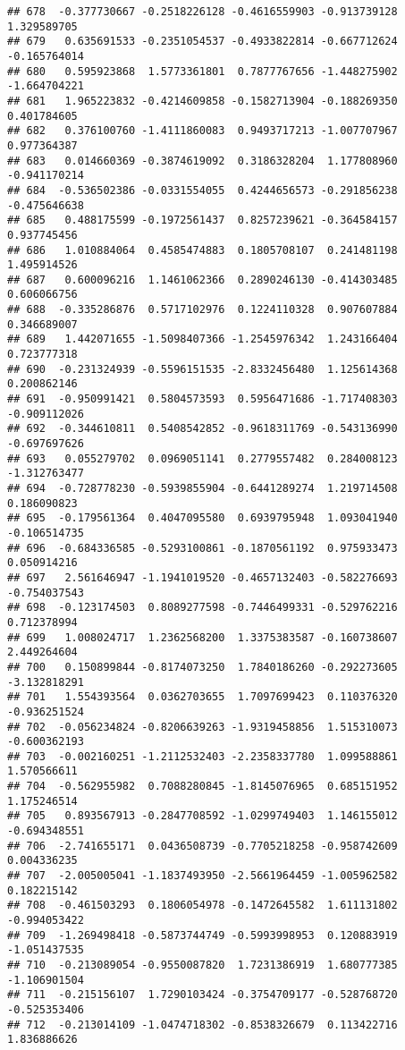 \documentclass[
]{article}
\begin{document}
\begin{verbatim}
## 678  -0.377730667 -0.2518226128 -0.4616559903 -0.913739128  1.329589705
## 679   0.635691533 -0.2351054537 -0.4933822814 -0.667712624 -0.165764014
## 680   0.595923868  1.5773361801  0.7877767656 -1.448275902 -1.664704221
## 681   1.965223832 -0.4214609858 -0.1582713904 -0.188269350  0.401784605
## 682   0.376100760 -1.4111860083  0.9493717213 -1.007707967  0.977364387
## 683   0.014660369 -0.3874619092  0.3186328204  1.177808960 -0.941170214
## 684  -0.536502386 -0.0331554055  0.4244656573 -0.291856238 -0.475646638
## 685   0.488175599 -0.1972561437  0.8257239621 -0.364584157  0.937745456
## 686   1.010884064  0.4585474883  0.1805708107  0.241481198  1.495914526
## 687   0.600096216  1.1461062366  0.2890246130 -0.414303485  0.606066756
## 688  -0.335286876  0.5717102976  0.1224110328  0.907607884  0.346689007
## 689   1.442071655 -1.5098407366 -1.2545976342  1.243166404  0.723777318
## 690  -0.231324939 -0.5596151535 -2.8332456480  1.125614368  0.200862146
## 691  -0.950991421  0.5804573593  0.5956471686 -1.717408303 -0.909112026
## 692  -0.344610811  0.5408542852 -0.9618311769 -0.543136990 -0.697697626
## 693   0.055279702  0.0969051141  0.2779557482  0.284008123 -1.312763477
## 694  -0.728778230 -0.5939855904 -0.6441289274  1.219714508  0.186090823
## 695  -0.179561364  0.4047095580  0.6939795948  1.093041940 -0.106514735
## 696  -0.684336585 -0.5293100861 -0.1870561192  0.975933473  0.050914216
## 697   2.561646947 -1.1941019520 -0.4657132403 -0.582276693 -0.754037543
## 698  -0.123174503  0.8089277598 -0.7446499331 -0.529762216  0.712378994
## 699   1.008024717  1.2362568200  1.3375383587 -0.160738607  2.449264604
## 700   0.150899844 -0.8174073250  1.7840186260 -0.292273605 -3.132818291
## 701   1.554393564  0.0362703655  1.7097699423  0.110376320 -0.936251524
## 702  -0.056234824 -0.8206639263 -1.9319458856  1.515310073 -0.600362193
## 703  -0.002160251 -1.2112532403 -2.2358337780  1.099588861  1.570566611
## 704  -0.562955982  0.7088280845 -1.8145076965  0.685151952  1.175246514
## 705   0.893567913 -0.2847708592 -1.0299749403  1.146155012 -0.694348551
## 706  -2.741655171  0.0436508739 -0.7705218258 -0.958742609  0.004336235
## 707  -2.005005041 -1.1837493950 -2.5661964459 -1.005962582  0.182215142
## 708  -0.461503293  0.1806054978 -0.1472645582  1.611131802 -0.994053422
## 709  -1.269498418 -0.5873744749 -0.5993998953  0.120883919 -1.051437535
## 710  -0.213089054 -0.9550087820  1.7231386919  1.680777385 -1.106901504
## 711  -0.215156107  1.7290103424 -0.3754709177 -0.528768720 -0.525353406
## 712  -0.213014109 -1.0474718302 -0.8538326679  0.113422716  1.836886626

\end{verbatim}
\end{document}
